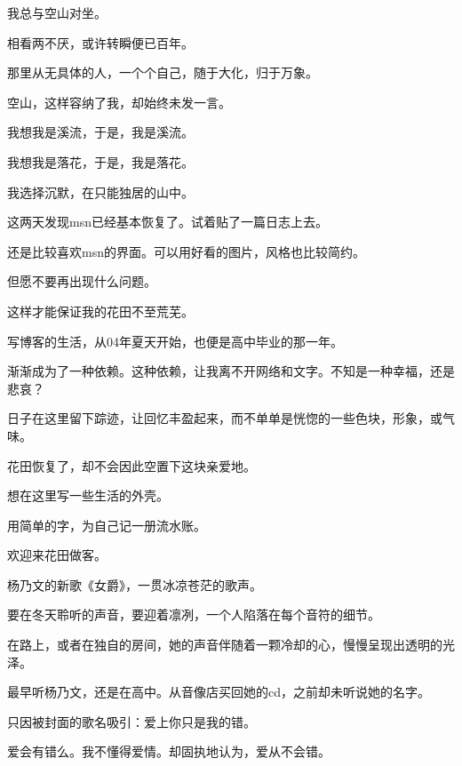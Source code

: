 		\vspace{1em}
		我总与空山对坐。\par
		相看两不厌，或许转瞬便已百年。\par
		那里从无具体的人，一个个自己，随于大化，归于万象。\par
		空山，这样容纳了我，却始终未发一言。

		\vspace{1em}
		我想我是溪流，于是，我是溪流。\par
		我想我是落花，于是，我是落花。

		\vspace{1em}
		我选择沉默，在只能独居的山中。

	\endwriting



		这两天发现msn已经基本恢复了。试着贴了一篇日志上去。\par
		还是比较喜欢msn的界面。可以用好看的图片，风格也比较简约。\par
		但愿不要再出现什么问题。\par
		这样才能保证我的花田不至荒芜。\par
		写博客的生活，从04年夏天开始，也便是高中毕业的那一年。\par
		渐渐成为了一种依赖。这种依赖，让我离不开网络和文字。不知是一种幸福，还是悲哀？\par
		日子在这里留下踪迹，让回忆丰盈起来，而不单单是恍惚的一些色块，形象，或气味。\par
		花田恢复了，却不会因此空置下这块亲爱地。\par
		想在这里写一些生活的外壳。\par
		用简单的字，为自己记一册流水账。

		欢迎来花田做客。

	\endwriting



		杨乃文的新歌《女爵》，一贯冰凉苍茫的歌声。\par
		要在冬天聆听的声音，要迎着凛冽，一个人陷落在每个音符的细节。\par
		在路上，或者在独自的房间，她的声音伴随着一颗冷却的心，慢慢呈现出透明的光泽。

		最早听杨乃文，还是在高中。从音像店买回她的cd，之前却未听说她的名字。\par
		只因被封面的歌名吸引：爱上你只是我的错。\par
		爱会有错么。我不懂得爱情。却固执地认为，爱从不会错。

